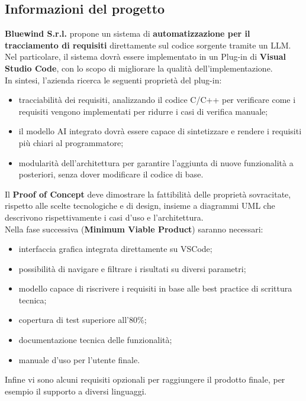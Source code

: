 \documentclass[10pt]{article}
\begin{document}
    \subsection{Informazioni del progetto}
    \textbf{Bluewind S.r.l.} propone un sistema di \textbf{automatizzazione per il tracciamento
    di requisiti} direttamente sul codice sorgente tramite un LLM. Nel particolare, il sistema dovrà essere
    implementato in un Plug-in di \textbf{Visual Studio Code}, con lo scopo di migliorare la qualità
    dell'implementazione.\\
    In sintesi, l'azienda ricerca le seguenti proprietà del plug-in:
    \begin{itemize}
        \item tracciabilità dei requisiti, analizzando il codice C/C++ per verificare come i requisiti vengono implementati per ridurre i casi di verifica manuale;
        \item il modello AI integrato dovrà essere capace di sintetizzare e rendere i requisiti più chiari al programmatore;
        \item modularità dell'architettura per garantire l'aggiunta di nuove funzionalità a posteriori, senza dover modificare il codice di base.
    \end{itemize}
    Il \textbf{Proof of Concept} deve dimostrare la fattibilità delle proprietà sovracitate, rispetto alle scelte tecnologiche e di design,
    insieme a diagrammi UML che descrivono rispettivamente i casi d'uso e l'architettura.\\
    Nella fase successiva (\textbf{Minimum Viable Product}) saranno necessari:
    \begin{itemize}
        \item interfaccia grafica integrata direttamente su VSCode;
        \item possibilità di navigare e filtrare i risultati su diversi parametri;
        \item modello capace di riscrivere i requisiti in base alle best practice di scrittura tecnica;
        \item copertura di test superiore all'80\%;
        \item documentazione tecnica delle funzionalità;
        \item manuale d'uso per l'utente finale.
    \end{itemize}
    Infine vi sono alcuni requisiti opzionali per raggiungere il prodotto finale, per esempio il supporto a diversi linguaggi.
    
\end{document}
